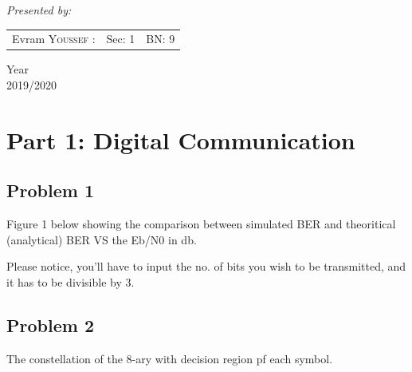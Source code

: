 \documentclass[a4paper,12pt]{report}
\begin{document}
\begin{titlepage}
\begin{center}
    \vspace{2cm}
    
    
    {\huge \textit{Presented by: }}\\[0.5cm]
    
    \color{black}
    \centering
    \begin{tabular}{lll}
    \large Evram \textsc{Youssef} : & \large Sec: 1 & \large BN: 9 \\[0.1cm]
    
    \end{tabular}
    
    \vfill
    
    {\LARGE {Year}\\ 2019/2020}
    \end{center}
    \end{titlepage}


    \newpage

    \tableofcontents
    \listoffigures
    \newpage


    \section{Part 1: Digital Communication}
        
    \subsection{Problem 1}
        Figure 1 below showing the comparison between simulated BER and theoritical (analytical) BER
        VS the Eb/N0 in db.

        Please notice, you'll have to input the no. 
            of bits you wish to be transmitted, and it has to be divisible by 3.

    \subsection{Problem 2}
        The constellation of the 8-ary with decision region pf each symbol.
\end{document}
